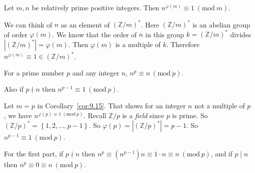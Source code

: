 \documentclass{notes}
\begin{document}
\begin{cor}
  Let $m, n$ be relatively prime positive integers.
  Then $n^{\varphi(m)} \equiv 1\ (\mathrm{mod}\ m)$.
\end{cor}

\begin{prf}
  We can think of $n$ as an element of $(\mathbb Z / m)^*$.
  Here $(\mathbb Z / m)^*$ is an abelian group of order $\varphi(m)$.
  We know that the order of $n$ in this group $k = (\mathbb Z / m)^*$ divides $\left | (\mathbb Z / m)^* \right | = \varphi(m)$.
  Then $\varphi(m)$ is a multiple of $k$.
  Therefore $n^{\varphi(m)} \equiv 1 \in (\mathbb Z / m)^*$.
\end{prf}

\begin{cor}
  For a prime number $p$ and any integer $n$, $n^p \equiv n\ (\mathrm{mod}\ p)$.
  
  Also if $p \nmid n$ then $n^{p - 1} \equiv 1\ (\mathrm{mod}\ p)$.
\end{cor}

\begin{prf}
  Let $m = p$ in Corollary~\ref{cor:9.15}.
  That shows for an integer $n$ not a multiple of $p$, we have $n^{\varphi(p) \equiv 1\ (\mathrm{mod}\ p)}$.
  Recall $\mathbb Z / p$ is a \textit{field} since $p$ is prime.
  So $(\mathbb Z / p)^* = \left \{ 1, 2, \dots, p - 1 \right \}$.
  So $\varphi(p) = \left | (\mathbb Z / p)^* \right | = p - 1$.
  So $n^{p - 1} \equiv 1\ (\mathrm{mod}\ p)$.
  
  For the first part, if $p \nmid n$ then $n^p \equiv \left ( n^{p - 1} \right ) n \equiv 1 \cdot n \equiv n\ (\mathrm{mod}\ p)$, and if $p \mid n$ then $n^p \equiv 0 \equiv n\ (\mathrm{mod}\ p)$.
\end{prf}
\end{document}

